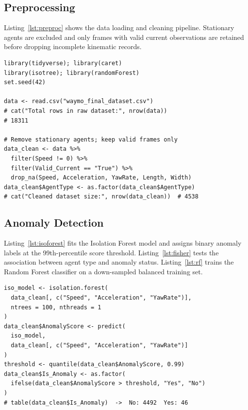 \documentclass[conference]{IEEEtran}
\begin{document}
\subsection{Preprocessing}

Listing~\ref{lst:preproc} shows the data loading and cleaning pipeline. Stationary agents are excluded and only frames with valid current observations are retained before dropping incomplete kinematic records.

\begin{lstlisting}[style=Rstyle, caption={Data loading and preprocessing.}, label={lst:preproc}]
library(tidyverse); library(caret)
library(isotree); library(randomForest)
set.seed(42)

data <- read.csv("waymo_final_dataset.csv")
# cat("Total rows in raw dataset:", nrow(data))
# 18311

# Remove stationary agents; keep valid frames only
data_clean <- data %>%
  filter(Speed != 0) %>%
  filter(Valid_Current == "True") %>%
  drop_na(Speed, Acceleration, YawRate, Length, Width)
data_clean$AgentType <- as.factor(data_clean$AgentType)
# cat("Cleaned dataset size:", nrow(data_clean))  # 4538
\end{lstlisting}

\newpage

\subsection{Anomaly Detection}

Listing~\ref{lst:isoforest} fits the Isolation Forest model and assigns binary anomaly labels at the 99th-percentile score threshold. Listing~\ref{lst:fisher} tests the association between agent type and anomaly status. Listing~\ref{lst:rf} trains the Random Forest classifier on a down-sampled balanced training set.

\begin{lstlisting}[style=Rstyle, caption={Isolation Forest scoring and anomaly labeling.}, label={lst:isoforest}]
iso_model <- isolation.forest(
  data_clean[, c("Speed", "Acceleration", "YawRate")],
  ntrees = 100, nthreads = 1
)
data_clean$AnomalyScore <- predict(
  iso_model,
  data_clean[, c("Speed", "Acceleration", "YawRate")]
)
threshold <- quantile(data_clean$AnomalyScore, 0.99)
data_clean$Is_Anomaly <- as.factor(
  ifelse(data_clean$AnomalyScore > threshold, "Yes", "No")
)
# table(data_clean$Is_Anomaly)  ->  No: 4492  Yes: 46
\end{lstlisting}
\end{document}
